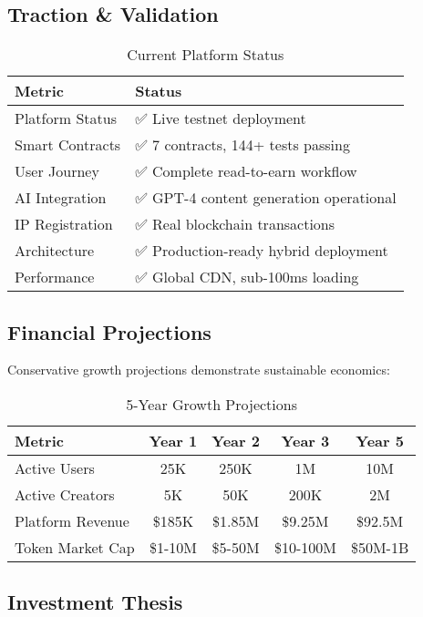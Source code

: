 \subsection{Traction \& Validation}

\begin{table}[H]
\centering
\caption{Current Platform Status}
\label{tab:platform-status}
\begin{tabular}{@{}ll@{}}
\toprule
\textbf{Metric} & \textbf{Status} \\
\midrule
Platform Status & ✅ Live testnet deployment \\
Smart Contracts & ✅ 7 contracts, 144+ tests passing \\
User Journey & ✅ Complete read-to-earn workflow \\
AI Integration & ✅ GPT-4 content generation operational \\
IP Registration & ✅ Real blockchain transactions \\
Architecture & ✅ Production-ready hybrid deployment \\
Performance & ✅ Global CDN, sub-100ms loading \\
\bottomrule
\end{tabular}
\end{table}

\subsection{Financial Projections}

Conservative growth projections demonstrate sustainable economics:

\begin{table}[H]
\centering
\caption{5-Year Growth Projections}
\label{tab:growth-projections}
\begin{tabular}{@{}lcccc@{}}
\toprule
\textbf{Metric} & \textbf{Year 1} & \textbf{Year 2} & \textbf{Year 3} & \textbf{Year 5} \\
\midrule
Active Users & 25K & 250K & 1M & 10M \\
Active Creators & 5K & 50K & 200K & 2M \\
Platform Revenue & \$185K & \$1.85M & \$9.25M & \$92.5M \\
Token Market Cap & \$1-10M & \$5-50M & \$10-100M & \$50M-1B \\
\bottomrule
\end{tabular}
\end{table}

\subsection{Investment Thesis}

